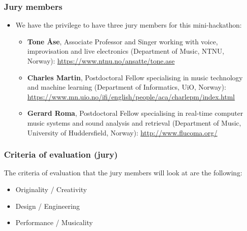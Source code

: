 \documentclass[screen, aspectratio=43]{beamer}
\begin{document}
%
\begin{frame}
  \frametitle{Jury members}
    \begin{itemize}
    	\item We have the privilege to have three jury members for this mini-hackathon:
	    \begin{itemize}
	    	\item \textbf{Tone Åse}, Associate Professor and Singer working with voice, improvisation and live electronics (Department of Music, NTNU, Norway): \url{https://www.ntnu.no/ansatte/tone.ase}
		\item \textbf{Charles Martin}, Postdoctoral Fellow specialising in music technology and machine learning (Department of Informatics, UiO, Norway): \url{https://www.mn.uio.no/ifi/english/people/aca/charlepm/index.html}
		\item \textbf{Gerard Roma}, Postdoctoral Fellow specialising in real-time computer music systems and sound analysis and retrieval (Department of Music, University of Huddersfield, Norway): \url{http://www.flucoma.org/}
        	    \end{itemize}
    \end{itemize}
\end{frame}
%
\begin{frame}
  \frametitle{Criteria of evaluation (jury)}
  The criteria of evaluation that the jury members will look at are the following:
    \begin{itemize}
    	\item Originality / Creativity
	\item Design / Engineering
	\item Performance / Musicality
    \end{itemize}
\end{frame}
%
\end{document}
